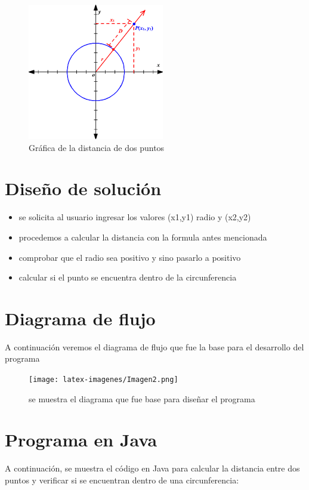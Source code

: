 \documentclass{IEEEcsmag}
\begin{document}
\begin{figure}[h!]
    \centering
    \includegraphics[width = 6 cm]{latex-imagenes/imagen7.png}
    \caption{Gráfica de la distancia de dos puntos}
    \label{fig:Grafica de la distancia de dos puntos }
\end{figure}

\section{Diseño de solución}
\begin{itemize}
    \item se solicita al usuario ingresar los valores (x1,y1) radio y (x2,y2)
    \item procedemos a calcular la distancia con la formula antes mencionada
    \item comprobar que el radio sea positivo y sino pasarlo a positivo
    \item calcular si el punto se encuentra dentro de la circunferencia
    
\end{itemize}

\section{Diagrama de flujo}
A continuación veremos el diagrama de flujo que fue la base para el desarrollo del programa
\begin{figure}[h!]
    \centering
    \texttt{[image: latex-imagenes/Imagen2.png]}
    \caption{se muestra el diagrama que fue base para diseñar el programa}
    \label{fig:diagrama de flujo}
\end{figure}
\section{Programa en Java}
A continuación, se muestra el código en Java para calcular la distancia entre dos puntos y verificar si se encuentran dentro de una circunferencia:
\end{document}
